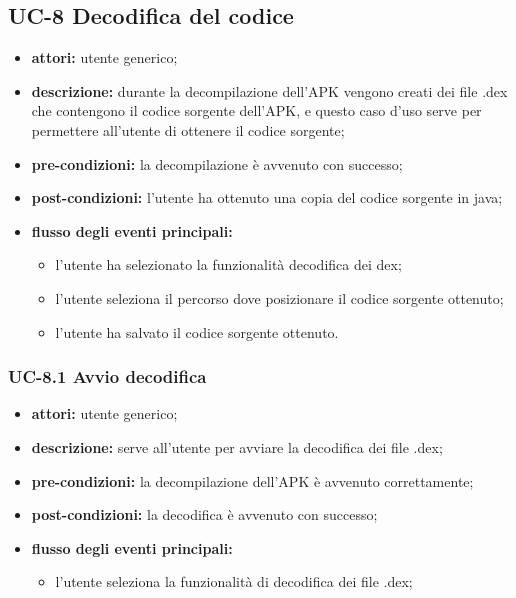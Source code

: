 \subsection*{UC-8 Decodifica del codice}\label{subsec:uc-8-decodifica-del-codice}
\begin{itemize}
    \item \textbf{attori:} utente generico;
    \item \textbf{descrizione:} durante la decompilazione dell'APK vengono creati dei file .dex che contengono il codice sorgente dell'APK, e questo caso d'uso serve per permettere all'utente di ottenere il codice sorgente;
    \item \textbf{pre-condizioni:} la decompilazione è avvenuto con successo;
    \item \textbf{post-condizioni:} l'utente ha ottenuto una copia del codice sorgente in java;
    \item \textbf{flusso degli eventi principali:}
    \begin{itemize}
        \item l'utente ha selezionato la funzionalità decodifica dei dex;
        \item l'utente seleziona il percorso dove posizionare il codice sorgente ottenuto;
        \item l'utente ha salvato il codice sorgente ottenuto.
    \end{itemize}
\end{itemize}
\subsubsection*{UC-8.1 Avvio decodifica}
\begin{itemize}
    \item \textbf{attori:} utente generico;
    \item \textbf{descrizione:} serve all'utente per avviare la decodifica dei file .dex;
    \item \textbf{pre-condizioni:} la decompilazione dell'APK è avvenuto correttamente;
    \item \textbf{post-condizioni:} la decodifica è avvenuto con successo;
    \item \textbf{flusso degli eventi principali:}
    \begin{itemize}
        \item l'utente seleziona la funzionalità di decodifica dei file .dex;
    \end{itemize}
\end{itemize}
